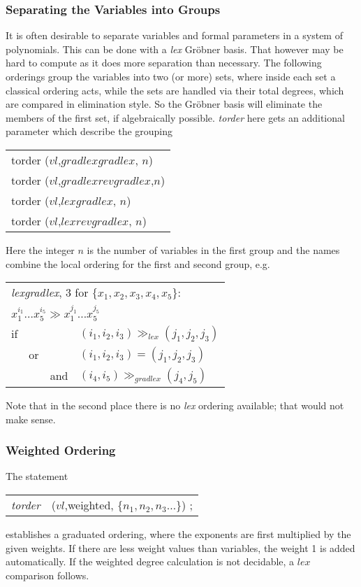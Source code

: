 \subsubsection{Separating the Variables into Groups }
It is often desirable to separate variables
and formal parameters in a system of polynomials.
This can be done with a {\it lex} Gr\"obner
basis.  That however may be hard to compute as it does more
separation than necessary. The following orderings group the
variables into two (or more) sets, where inside each set a classical
ordering acts, while the sets are handled via their total degrees,
which are compared in elimination style. So the Gr\"obner basis will
eliminate the members of the first set, if algebraically possible.
{\it torder} here gets an additional parameter which describe the
grouping 
\begin{center}{\it
\begin{tabular}{l}
torder ($vl$,$gradlexgradlex$, $n$) \\
torder ($vl$,$gradlexrevgradlex$,$n$) \\
torder ($vl$,$lexgradlex$, $n$) \\
torder ($vl$,$lexrevgradlex$, $n$)
\end{tabular}}
\end{center}
Here the integer $n$ is the number of variables in the first group
and the names combine the local ordering for the first and second
group, e.g.
\begin{center}
\begin{tabular}{llll}
\multicolumn{4}{l}{{\it lexgradlex}, 3 for $\{x_1,x_2,x_3,x_4,x_5\}$:} \\
\multicolumn{4}{l}{$x_1^{i_1}\ldots x_5^{i_5} \gg x_1^{j_1}\ldots
x_5^{j_5}$} \\
if & & & $(i_1,i_2,i_3) \gg_{lex}(j_1,j_2,j_3)$ \\
& or & & $(i_1,i_2,i_3) = (j_1,j_2,j_3)$ \\
& & and & $(i_4,i_5) \gg_{gradlex}(j_4,j_5)$
\end{tabular}
\end{center}
Note that in the second place there is no {\it lex} ordering available;
that would not make sense.

\subsubsection{Weighted Ordering}
 
The statement
\begin{center}
\begin{tabular}{cl}
{\it torder} &($vl$,weighted, $\{n_1,n_2,n_3  \ldots$\}) ; \\
\end{tabular}
\end{center}
establishes a graduated ordering, where the exponents are first
multiplied by the given weights. If there are less weight values than
variables, the weight 1 is added automatically. If the weighted
degree calculation is not decidable, a $lex$ comparison follows.

